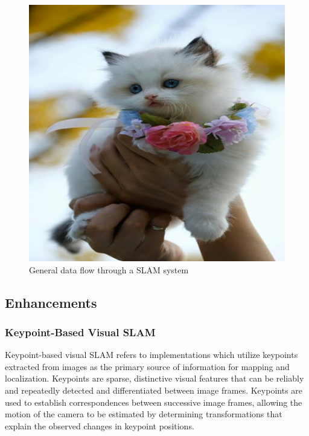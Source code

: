 \begin{figure}[h!]
    \includegraphics[width=\textwidth]{resources/placeholder.jpeg}
    \caption{General data flow through a SLAM system}
    \label{fig:general_slam_pipeline}
\end{figure}


\subsection{Enhancements}

\subsubsection{Keypoint-Based Visual SLAM}


Keypoint-based visual SLAM refers to implementations which utilize keypoints extracted from images as the primary source of information for mapping and localization. Keypoints are sparse, distinctive visual features that can be reliably and repeatedly detected and differentiated between image frames. Keypoints are used to establish correspondences between successive image frames, allowing the motion of the camera to be estimated by determining transformations that explain the observed changes in keypoint positions.


